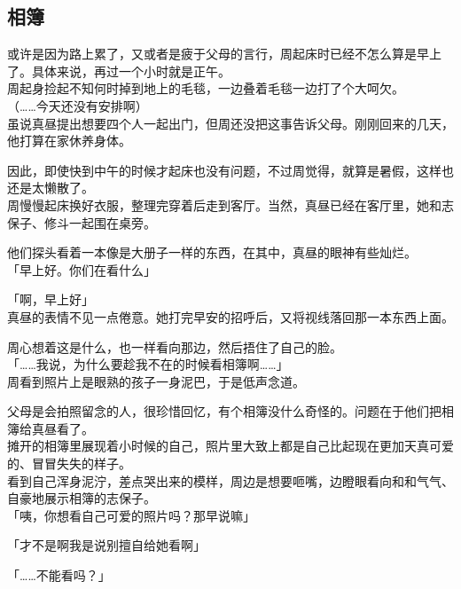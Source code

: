 \subsection{相簿}

或许是因为路上累了，又或者是疲于父母的言行，周起床时已经不怎么算是早上了。具体来说，再过一个小时就是正午。\\

周起身捡起不知何时掉到地上的毛毯，一边叠着毛毯一边打了个大呵欠。\\

（……今天还没有安排啊）\\

虽说真昼提出想要四个人一起出门，但周还没把这事告诉父母。刚刚回来的几天，他打算在家休养身体。

因此，即使快到中午的时候才起床也没有问题，不过周觉得，就算是暑假，这样也还是太懒散了。\\

周慢慢起床换好衣服，整理完穿着后走到客厅。当然，真昼已经在客厅里，她和志保子、修斗一起围在桌旁。

他们探头看着一本像是大册子一样的东西，在其中，真昼的眼神有些灿烂。\\

「早上好。你们在看什么」

「啊，早上好」\\

真昼的表情不见一点倦意。她打完早安的招呼后，又将视线落回那一本东西上面。

周心想着这是什么，也一样看向那边，然后捂住了自己的脸。\\

「……我说，为什么要趁我不在的时候看相簿啊……」\\

周看到照片上是眼熟的孩子一身泥巴，于是低声念道。

父母是会拍照留念的人，很珍惜回忆，有个相簿没什么奇怪的。问题在于他们把相簿给真昼看了。\\

摊开的相簿里展现着小时候的自己，照片里大致上都是自己比起现在更加天真可爱的、冒冒失失的样子。\\

看到自己浑身泥泞，差点哭出来的模样，周边是想要咂嘴，边瞪眼看向和和气气、自豪地展示相簿的志保子。\\

「咦，你想看自己可爱的照片吗？那早说嘛」

「才不是啊我是说别擅自给她看啊」

「……不能看吗？」

